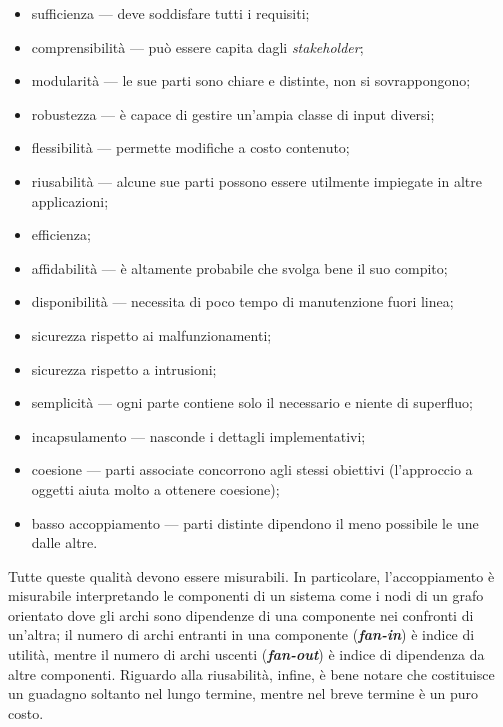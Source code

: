 \documentclass[a4paper]{article}
\begin{document}
	\begin{itemize}
		
			
	\item sufficienza --- deve soddisfare tutti i requisiti;
			
	\item comprensibilità --- può essere capita dagli \emph{stakeholder};
			
	\item modularità --- le sue parti sono chiare e distinte, non si sovrappongono;
			
	\item robustezza --- è capace di gestire un'ampia classe di input diversi;
			
	\item flessibilità --- permette modifiche a costo contenuto;
			
	\item riusabilità --- alcune sue parti possono essere utilmente impiegate in altre applicazioni;
			
	\item efficienza;
			
	\item affidabilità --- è altamente probabile che svolga bene il suo compito;
			
	\item disponibilità --- necessita di poco tempo di manutenzione fuori linea;
			
	\item sicurezza rispetto ai malfunzionamenti;
			
	\item sicurezza rispetto a intrusioni;
			
	\item semplicità --- ogni parte contiene solo il necessario e niente di superfluo;
			
	\item incapsulamento --- nasconde i dettagli implementativi;
			
	\item coesione --- parti associate concorrono agli stessi obiettivi (l'approccio a oggetti aiuta molto a ottenere coesione);
			
	\item basso accoppiamento --- parti distinte dipendono il meno possibile le une dalle altre.
		
	\end{itemize}

		
Tutte queste qualità devono essere misurabili. In particolare, l'accoppiamento è misurabile interpretando le componenti di un sistema come i nodi di un grafo orientato dove gli archi sono dipendenze di una componente nei confronti di un'altra; il numero di archi entranti in una componente (\textbf{\emph{fan-in}}) è indice di utilità, mentre il numero di archi uscenti (\textbf{\emph{fan-out}}) è indice di dipendenza da altre componenti. Riguardo alla riusabilità, infine, è bene notare che costituisce un guadagno soltanto nel lungo termine, mentre nel breve termine è un puro costo.
\end{document}
